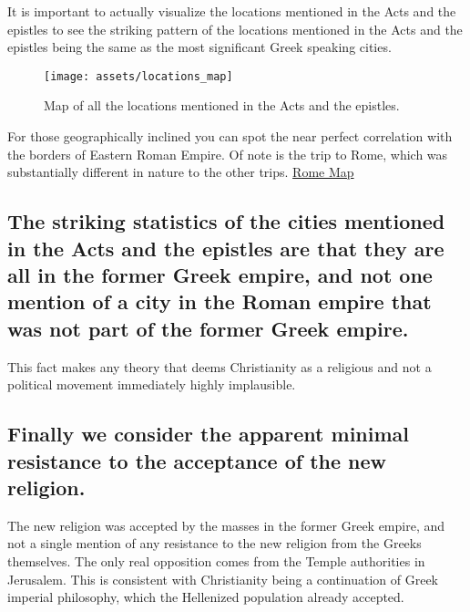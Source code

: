 It is important to actually visualize the locations mentioned in the Acts and the epistles to see the striking pattern of the locations mentioned in the Acts and the epistles being the same as the most significant Greek speaking cities.

\begin{figure}[ht]
    \centering
    \texttt{[image: assets/locations\_map]}
    \caption{Map of all the locations mentioned in the Acts and the epistles.}
    \label{fig:figure}
\end{figure}

For those geographically inclined you can spot the near perfect correlation with the borders of Eastern Roman Empire.
Of note is the trip to Rome, which was substantially different in nature to the other trips.
\href{https://en.wikipedia.org/wiki/Byzantine_Empire_under_the_Theodosian_dynasty\#/media/File:4KTHEODOSIAN.png}{Rome Map}

\subsection{The striking statistics of the cities mentioned in the Acts and the epistles are that they are all in the former Greek empire, and not one mention of a city in the Roman empire that was not part of the former Greek empire.}\label{subsec:the-striking-statistics-of-the-cities-mentioned-in-the-acts-and-the-epistles-are-that-they-are-all-in-the-former-greek-empire-and-not-one-mention-of-a-city-in-the-roman-empire-that-was-not-part-of-the-former-greek-empire.}

This fact makes any theory that deems Christianity as a religious and not a political movement immediately highly implausible.

\subsection{Finally we consider the apparent minimal resistance to the acceptance of the new religion.}\label{subsec:finally-we-consider-the-apparent-minimal-resistance-to-the-acceptance-of-the-new-religion.}

The new religion was accepted by the masses in the former Greek empire, and not a single mention of any resistance to the new religion from the Greeks themselves.
The only real opposition comes from the Temple authorities in Jerusalem.
This is consistent with Christianity being a continuation of Greek imperial philosophy, which the Hellenized population already accepted.

